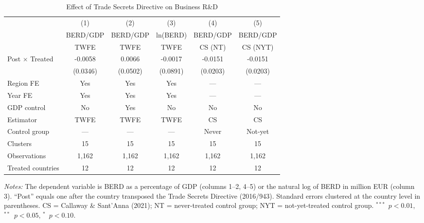 \begin{table}[htbp]
\centering
\caption{Effect of Trade Secrets Directive on Business R\&D}
\label{tab:main}
\begin{adjustbox}{max width=\textwidth}
\begin{tabular}{lccccc}
\hline\hline
 & (1) & (2) & (3) & (4) & (5) \\
 & BERD/GDP & BERD/GDP & ln(BERD) & BERD/GDP & BERD/GDP \\
 & TWFE & TWFE & TWFE & CS (NT) & CS (NYT) \\
\hline
Post $\times$ Treated & -0.0058 & 0.0066 & -0.0017 & -0.0151 & -0.0151 \\
 & (0.0346) & (0.0502) & (0.0891) & (0.0203) & (0.0203) \\
\hline
Region FE & Yes & Yes & Yes & --- & --- \\
Year FE & Yes & Yes & Yes & --- & --- \\
GDP control & No & Yes & No & No & No \\
Estimator & TWFE & TWFE & TWFE & CS & CS \\
Control group & --- & --- & --- & Never & Not-yet \\
Clusters & 15 & 15 & 15 & 15 & 15 \\
Observations & 1,162 & 1,162 & 1,162 & 1,162 & 1,162 \\
Treated countries & 12 & 12 & 12 & 12 & 12 \\
\hline\hline
\end{tabular}
\end{adjustbox}
\begin{tablenotes}[flushleft]
\small
\item \textit{Notes:} The dependent variable is BERD as a percentage of GDP (columns 1--2, 4--5) or the natural log of BERD in million EUR (column 3). ``Post'' equals one after the country transposed the Trade Secrets Directive (2016/943). Standard errors clustered at the country level in parentheses. CS = Callaway \& Sant'Anna (2021); NT = never-treated control group; NYT = not-yet-treated control group. $^{***}$~$p<0.01$, $^{**}$~$p<0.05$, $^{*}$~$p<0.10$.
\end{tablenotes}
\end{table}
